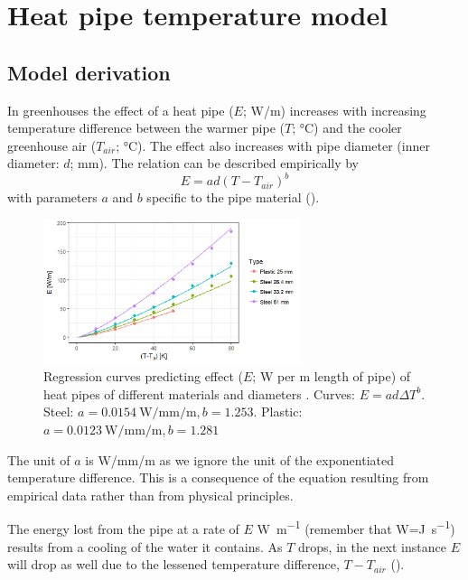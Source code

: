 \chapter{Heat pipe temperature model}

\section{Model derivation}
In greenhouses the effect of a heat pipe ($E$; \si{W/m}) increases with increasing temperature difference between the warmer pipe ($T$; \si{\degreeCelsius}) and the cooler greenhouse air ($T_{air}$; \si{\degreeCelsius}). The effect also increases with pipe diameter (inner diameter: $d$; \si{mm}). The relation can be described empirically by
\begin{equation}
  E=ad\left(T-T_{air}\right)^b
  \label{eq:vg-heat-pipe-E}
\end{equation}
with parameters $a$ and $b$ specific to the pipe material ().

\begin{figure} [ht]
\centering
\includegraphics[width=0.67\textwidth]{graphics/vg/heat-pipe-regression.png}
\caption{Regression curves predicting effect ($E$; \si{W} per \si{m} length of pipe) of heat pipes of different materials and diameters \citep[after][Table.~4.3.4]{Braak95}. Curves: $E=ad{\Delta T}^b$. Steel: $a=\SI{0.0154}{\watt\per\milli\meter\per\meter}, b=1.253$. Plastic: $a=\SI{0.0123}{\watt\per\milli\meter\per\meter}, b=1.281$}
\label{fig:vg-heat-pipe-regression}
\end{figure}

The unit of $a$ is \si{W/mm/m} as we ignore the unit of the exponentiated temperature difference. This is a consequence of the equation resulting from empirical data rather than from physical principles.

The energy lost from the pipe at a rate of $E$ \si{\watt\per\meter} (remember that \si{\watt}=\si{\joule\per\second}) results from a cooling of the water it contains. As $T$ drops, in the next instance $E$ will drop as well due to the lessened temperature difference, $T-T_{air}$ (). 


